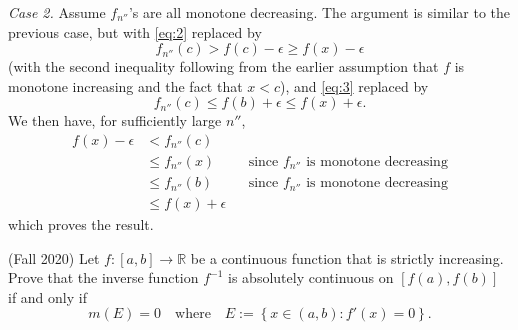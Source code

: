 \documentclass{exam}
\theoremstyle{problemstyle}
\newcommand{\1}[1]{\textbf{1}_{\left[#1\right]}} %
\begin{document}
\begin{questions}
\begin{solution}
\textit{Case 2.} Assume $f_{n''}$'s are all monotone decreasing. The argument is
similar to the previous case, but with \eqref{eq:2} replaced by
\begin{equation*}
  f_{n''}(c)>f(c)-\epsilon \geq f(x)-\epsilon
\end{equation*}
(with the second inequality following from the earlier assumption that $f$ is
monotone increasing and the fact that $x<c$), and \eqref{eq:3} replaced by
\begin{equation*}
  f_{n''}(c) \leq f(b) +\epsilon \leq f(x)+ \epsilon.
\end{equation*}
We then have, for sufficiently large $n''$, 
\begin{align*}
  f(x)-\epsilon
  &< f_{n''}(c)\\
  &\leq f_{n''}(x)
  &&\text{since $f_{n''}$ is monotone decreasing}\\
  &\leq f_{n''}(b)
  &&\text{since $f_{n''}$ is monotone decreasing}\\
  &\leq f(x)+\epsilon
\end{align*}
which proves the result.
\end{solution}

\question (Fall 2020) Let $f:[a,b] \to \mathbb{R}$ be a continuous function that is strictly
increasing. Prove that the inverse function $f^{-1}$ is absolutely continuous on
$[f(a),f(b)]$ if and only if
\begin{equation*}
  m(E) = 0 \quad \text{where} \quad E:= \left\{ x\in (a,b): f'(x)=0 \right\}.
\end{equation*}


\end{questions}
\end{document}
